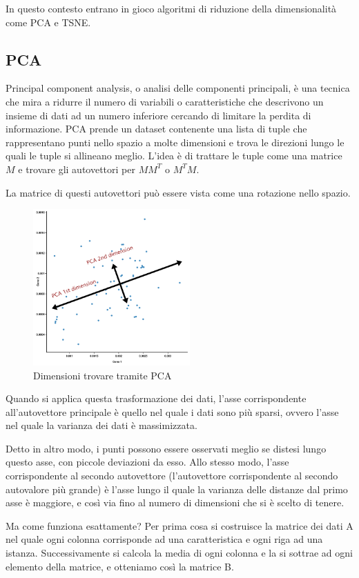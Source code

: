 \documentclass[12pt,italian]{report}
\begin{document}
In questo contesto entrano in gioco algoritmi di riduzione della dimensionalità come PCA e TSNE.

\subsection{PCA}
Principal component analysis, o analisi delle componenti principali, è una tecnica che mira a ridurre il numero di variabili o caratteristiche che descrivono un insieme di dati ad un numero inferiore cercando di limitare la perdita di informazione.
PCA prende un dataset contenente una lista di tuple che rappresentano punti nello spazio a molte dimensioni e trova le direzioni lungo le quali le tuple si allineano meglio. L'idea è di trattare le tuple come una matrice $M$ e trovare gli autovettori per $M M^{T}$ o $M^{T}M$. 

La matrice di questi autovettori può essere vista come una rotazione nello spazio. 
\begin{figure}[h]
\centering
\includegraphics[width = 60mm]{immagini/pca}
\caption{Dimensioni trovare tramite PCA}
\end{figure}


Quando si applica questa trasformazione dei dati, l'asse corrispondente all'autovettore principale è quello nel quale i dati sono più sparsi, ovvero l'asse nel quale la varianza dei dati è massimizzata.

Detto in altro modo, i punti possono essere osservati meglio se distesi lungo questo asse, con piccole deviazioni da esso. Allo stesso modo, l'asse corrispondente al secondo autovettore (l'autovettore corrispondente al secondo autovalore più grande) è l'asse lungo il quale la varianza delle distanze dal primo asse è maggiore, e così via fino al numero di dimensioni che si è scelto di tenere.

Ma come funziona esattamente? 
Per prima cosa si costruisce la matrice dei dati A nel quale ogni colonna corrisponde ad una caratteristica e ogni riga ad una istanza. Successivamente si calcola la media di ogni colonna e la si sottrae ad ogni elemento della matrice, e otteniamo così la matrice B.
\end{document}
